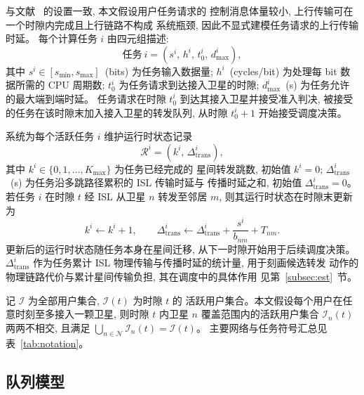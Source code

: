 \documentclass[a4paper,11pt]{article}
\begin{document}
与文献~\cite{zhang2024mhspo} 的设置一致, 本文假设用户任务请求的
控制消息体量较小, 上行传输可在一个时隙内完成且上行链路不构成
系统瓶颈, 因此不显式建模任务请求的上行传输时延。
每个计算任务 $i$ 由四元组描述:
\begin{equation}
    \text{任务}~i = \left(s^i,\, h^i,\, t^i_0,\, d^i_{\max}\right),
    \label{eq:task_tuple}
\end{equation}
其中 $s^i \in [s_{\min}, s_{\max}]$~(bits) 为任务输入数据量;
$h^i$~(cycles/bit) 为处理每 bit 数据所需的 CPU 周期数;
$t^i_0$ 为任务请求到达接入卫星的时隙;
$d^i_{\max}$~(s) 为任务允许的最大端到端时延。
任务请求在时隙 $t^i_0$ 到达其接入卫星并接受准入判决,
被接受的任务在该时隙末加入接入卫星的转发队列, 
从时隙 $t^i_0 + 1$ 开始接受调度决策。

系统为每个活跃任务 $i$ 维护运行时状态记录
\begin{equation}
    \mathcal{R}^i = \left(k^i,\, \Delta^i_{\mathrm{trans}}\right),
\end{equation}
其中 $k^i \in \{0, 1, \ldots, K_{\max}\}$ 为任务已经完成的
星间转发跳数, 初始值 $k^i = 0$;
$\Delta^i_{\mathrm{trans}}$~(s) 为任务沿多跳路径累积的 ISL 传输时延与
传播时延之和, 初始值 $\Delta^i_{\mathrm{trans}} = 0$。
若任务 $i$ 在时隙 $t$ 经 ISL 从卫星 $n$ 转发至邻居 $m$,
则其运行时状态在时隙末更新为
\begin{equation}
    k^i \leftarrow k^i + 1, \qquad
    \Delta^i_{\mathrm{trans}} \leftarrow
    \Delta^i_{\mathrm{trans}} + \frac{s^i}{b_{nm}} + T_{nm}.
    \label{eq:runtime_update}
\end{equation}
更新后的运行时状态随任务本身在星间迁移,
从下一时隙开始用于后续调度决策。$\Delta^i_{\mathrm{trans}}$
作为任务累计 ISL 物理传输与传播时延的统计量, 用于刻画候选转发
动作的物理链路代价与累计星间传输负担, 其在调度中的具体作用
见第~\ref{subsec:est}~节。

记 $\mathcal{I}$ 为全部用户集合, $\mathcal{I}(t)$ 为时隙 $t$ 的
活跃用户集合。本文假设每个用户在任意时刻至多接入一颗卫星,
则时隙 $t$ 内卫星 $n$ 覆盖范围内的活跃用户集合 $\mathcal{I}_n(t)$
两两不相交, 且满足
$\bigcup_{n \in \mathcal{N}} \mathcal{I}_n(t) = \mathcal{I}(t)$。
主要网络与任务符号汇总见表~\ref{tab:notation}。


\subsection{队列模型}
\label{subsec:queue_model}
\end{document}
